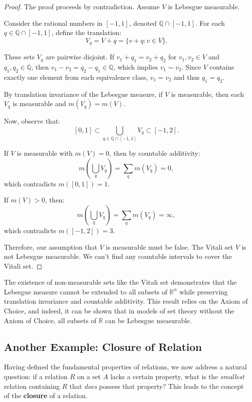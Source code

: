 \documentclass[oneside]{book}
\begin{document}
\begin{proof}
The proof proceeds by contradiction. Assume \( V \) is Lebesgue measurable.

Consider the rational numbers in \([-1,1]\), denoted \(\mathbb{Q} \cap [-1,1]\). For each \( q \in \mathbb{Q} \cap [-1,1] \), define the translation:
\[
V_q = V + q = \{ v + q : v \in V \}.
\]

These sets \( V_q \) are pairwise disjoint. If \( v_1 + q_1 = v_2 + q_2 \) for \( v_1, v_2 \in V \) and \( q_1, q_2 \in \mathbb{Q} \), then \( v_1 - v_2 = q_2 - q_1 \in \mathbb{Q} \), which implies \( v_1 \sim v_2 \). Since \( V \) contains exactly one element from each equivalence class, \( v_1 = v_2 \) and thus \( q_1 = q_2 \).

By translation invariance of the Lebesgue measure, if \( V \) is measurable, then each \( V_q \) is measurable and \( m(V_q) = m(V) \).

Now, observe that:
\[
[0,1] \subset \bigcup_{q \in \mathbb{Q} \cap [-1,1]} V_q \subset [-1,2].
\]

If \( V \) is measurable with \( m(V) = 0 \), then by countable additivity:
\[
m\left( \bigcup_{q} V_q \right) = \sum_{q} m(V_q) = 0,
\]
which contradicts \( m([0,1]) = 1 \).

If \( m(V) > 0 \), then:
\[
m\left( \bigcup_{q} V_q \right) = \sum_{q} m(V_q) = \infty,
\]
which contradicts \( m([-1,2]) = 3 \).

Therefore, our assumption that \( V \) is measurable must be false. The Vitali set \( V \) is not Lebesgue measurable. We can't find any countable intervals to cover the Vitali set.
\end{proof}


\begin{remark}
The existence of non-measurable sets like the Vitali set demonstrates that the Lebesgue measure cannot be extended to all subsets of \(\mathbb{R}^n\) while preserving translation invariance and countable additivity. This result relies on the Axiom of Choice, and indeed, it can be shown that in models of set theory without the Axiom of Choice, all subsets of \(\mathbb{R}\) can be Lebesgue measurable.
\end{remark}

\newpage

\subsection{Another Example: Closure of Relation}
Having defined the fundamental properties of relations, we now address a natural question: if a relation $R$ on a set $A$ lacks a certain property, what is the \emph{smallest} relation containing $R$ that \emph{does} possess that property? This leads to the concept of the \textbf{closure} of a relation.
\end{document}
